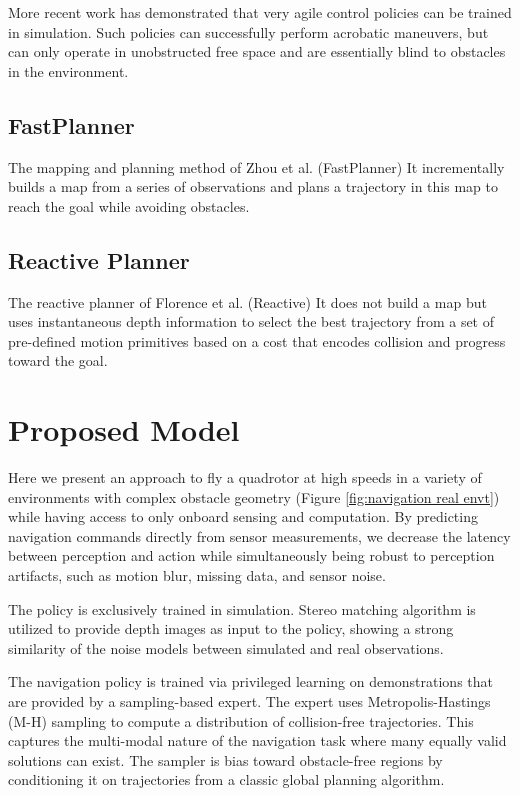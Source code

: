 More recent work has demonstrated that very agile control
policies can be trained in simulation. Such policies can successfully perform acrobatic maneuvers, but can only
operate in unobstructed free space and are essentially blind to obstacles
in the environment.

\subsection{FastPlanner}
The mapping and planning method of Zhou et al. (FastPlanner)
It incrementally builds a map from a
series of observations and plans a trajectory in this map to reach the
goal while avoiding obstacles. 


\subsection{Reactive Planner}
The reactive planner of Florence et al. (Reactive)
It does not build a map but uses instantaneous depth information to select the best trajectory from a set of pre-defined motion primitives
based on a cost that encodes collision and progress toward the goal.


\section{Proposed Model}
Here we present an approach to fly a quadrotor at high speeds in
a variety of environments with complex obstacle geometry (Figure \ref{fig:navigation real envt}) while having access to only onboard sensing and computation. By predicting navigation commands directly from sensor
measurements, we decrease the latency between perception and action while simultaneously being robust to perception artifacts, such
as motion blur, missing data, and sensor noise. 

The policy
is exclusively trained in simulation. Stereo matching algorithm is utilized to provide depth images as input
to the policy, showing a strong similarity of the noise models between simulated
and real observations.

The navigation policy is trained via privileged learning on
demonstrations that are provided by a sampling-based expert. The expert
uses Metropolis-Hastings (M-H) sampling to compute a distribution
of collision-free trajectories. This captures the multi-modal nature of
the navigation task where many equally valid solutions can exist. The sampler is bias toward
obstacle-free regions by conditioning it on trajectories from a classic
global planning algorithm.

